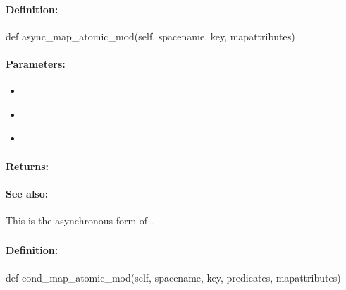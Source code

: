 \paragraph{Definition:}
\begin{pythoncode}
def async_map_atomic_mod(self, spacename, key, mapattributes)
\end{pythoncode}

\paragraph{Parameters:}
\begin{itemize}[noitemsep]
\item {}\\

\item {}\\

\item {}\\

\end{itemize}

\paragraph{Returns:}


\paragraph{See also:}  This is the asynchronous form of .

\pagebreak
\subsubsection{}
\label{api:python:cond_map_atomic_mod}


\paragraph{Definition:}
\begin{pythoncode}
def cond_map_atomic_mod(self, spacename, key, predicates, mapattributes)
\end{pythoncode}

